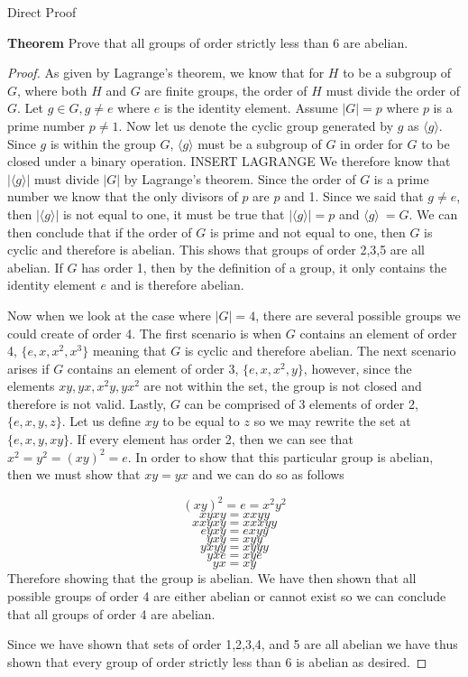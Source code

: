 Direct Proof

\textbf{Theorem}
Prove that all groups of order strictly less than $6$ are abelian.

\begin{proof}
As given by Lagrange's theorem, we know that for $H$ to be a subgroup of $G$, where both $H$ and $G$ are finite groups, the order of $H$ must divide the order of $G$. Let $g\in G, g \neq e$ where $e$ is the identity element. Assume $|G| = p$ where $p$ is a prime number $p \neq 1$. Now let us denote the cyclic group generated by $g$ as $\langle g \rangle$. Since $g$ is within the group $G$, $\langle g \rangle$ must be a subgroup of $G$ in order for $G$ to be closed under a binary operation. INSERT LAGRANGE We therefore know that $|\langle g \rangle|$ must divide $|G|$ by Lagrange's theorem. Since the order of $G$ is a prime number we know that the only divisors of $p$ are $p$ and 1. Since we said that $ g \neq e$, then $|\langle g \rangle|$ is not equal to one, it must be true that $|\langle g \rangle| = p$ and $\langle g \rangle \ = G$. We can then conclude that if the order of $G$ is prime and not equal to one, then $G$ is cyclic and therefore is abelian. This shows that groups of order 2,3,5 are all abelian. If $G$ has order 1, then by the definition of a group, it only contains the identity element $e$ and is therefore abelian. 


Now when we look at the case where $|G| = 4$, there are several possible groups we could create of order 4. The first scenario is when $G$ contains an element of order 4, $\{ e, x, x^2, x^3 \}$ meaning that $G$ is cyclic and therefore abelian. The next scenario arises if $G$ contains an element of order 3, $\{ e, x, x^2, y \}$, however, since the elements $xy, yx, x^2y, yx^2$ are not within the set, the group is not closed and therefore is not valid. Lastly, $G$ can be comprised of 3 elements of order 2, $\{ e, x, y, z \}$. Let us define $xy$ to be equal to $z$ so we may rewrite the set at $\{ e, x, y, xy \}$. If every element has order 2, then we can see that $x^2 = y^2 = (xy)^2 = e$. In order to show that this particular group is abelian, then we must show that $xy = yx$ and we can do so as follows

$$(xy)^2  = e = x^2y^2$$
$$ xyxy=xxyy$$
$$ xxyxy =xxxyy$$
$$ eyxy = exyy$$
$$ yxy = xyy$$
$$ yxyy = xyyy$$
$$ yxe = xye$$
$$yx = xy $$
Therefore showing that the group is abelian. We have then shown that all possible groups of order 4 are either abelian or cannot exist so we can conclude that all groups of order 4 are abelian.

Since we have shown that sets of order 1,2,3,4, and 5 are all abelian we have thus shown that every group of order strictly less than $6$ is abelian as desired.
\end{proof}